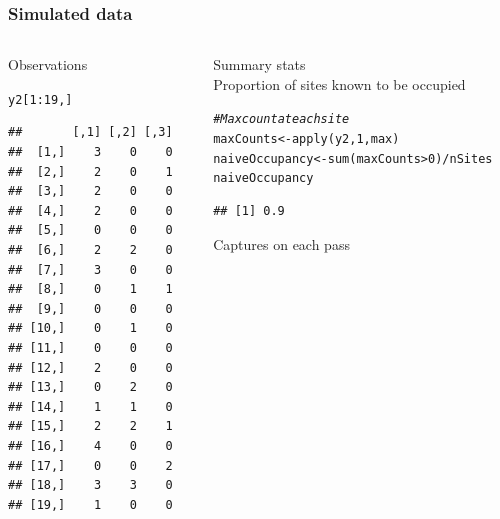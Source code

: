 \documentclass[color=usenames,dvipsnames]{beamer}\usepackage[]{graphicx}\usepackage[]{color}
\makeatletter
\newcommand{\hlnum}[1]{\textcolor[rgb]{0.69,0.494,0}{#1}}%
\newcommand{\hlcom}[1]{\textcolor[rgb]{0.514,0.506,0.514}{\textit{#1}}}%
\newcommand{\hlopt}[1]{\textcolor[rgb]{0,0,0}{#1}}%
\newcommand{\hlstd}[1]{\textcolor[rgb]{0,0,0}{#1}}%
\newcommand{\hlkwb}[1]{\textcolor[rgb]{0,0.341,0.682}{#1}}%
\newcommand{\hlkwd}[1]{\textcolor[rgb]{0.004,0.004,0.506}{#1}}%
\newenvironment{kframe}{%
 \def\at@end@of@kframe{}%
 \ifinner\ifhmode%
  \def\at@end@of@kframe{\end{minipage}}%
  \begin{minipage}{\columnwidth}%
 \fi\fi%
 \def\FrameCommand##1{\hskip\@totalleftmargin \hskip-\fboxsep
 \colorbox{shadecolor}{##1}\hskip-\fboxsep
     \hskip-\linewidth \hskip-\@totalleftmargin \hskip\columnwidth}%
 \MakeFramed {\advance\hsize-\width
   \@totalleftmargin\z@ \linewidth\hsize
   \@setminipage}}%
 {\par\unskip\endMakeFramed%
 \at@end@of@kframe}
\newenvironment{knitrout}{}{} %
\makeatother
\begin{document}
\begin{frame}[fragile]
  \frametitle{Simulated data}
  \begin{columns}
    \begin{column}{0.4\textwidth}
      \small
      Observations
  \vspace{-6pt}
\begin{knitrout}\scriptsize
{}\color{fgcolor}\begin{kframe}
\begin{alltt}
\hlstd{y2[}\hlnum{1}\hlopt{:}\hlnum{19}\hlstd{,]}
\end{alltt}
\begin{verbatim}
##       [,1] [,2] [,3]
##  [1,]    3    0    0
##  [2,]    2    0    1
##  [3,]    2    0    0
##  [4,]    2    0    0
##  [5,]    0    0    0
##  [6,]    2    2    0
##  [7,]    3    0    0
##  [8,]    0    1    1
##  [9,]    0    0    0
## [10,]    0    1    0
## [11,]    0    0    0
## [12,]    2    0    0
## [13,]    0    2    0
## [14,]    1    1    0
## [15,]    2    2    1
## [16,]    4    0    0
## [17,]    0    0    2
## [18,]    3    3    0
## [19,]    1    0    0
\end{verbatim}
\end{kframe}
\end{knitrout}
  \end{column}
  \begin{column}{0.6\textwidth}
    \pause
    {\centering Summary stats \\}
    \vspace{24pt}
    \small
    Proportion of sites known to be occupied
    \vspace{-6pt}
\begin{knitrout}\scriptsize
{}\color{fgcolor}\begin{kframe}
\begin{alltt}
\hlcom{# Max count at each site}
\hlstd{maxCounts} \hlkwb{<-} \hlkwd{apply}\hlstd{(y2,} \hlnum{1}\hlstd{, max)}
\hlstd{naiveOccupancy} \hlkwb{<-} \hlkwd{sum}\hlstd{(maxCounts}\hlopt{>}\hlnum{0}\hlstd{)}\hlopt{/}\hlstd{nSites}
\hlstd{naiveOccupancy}
\end{alltt}
\begin{verbatim}
## [1] 0.9
\end{verbatim}
\end{kframe}
\end{knitrout}
  \pause
  \vfill
  \small
  Captures on each pass
  \vspace{-6pt}

\end{column}
\end{columns}
\end{frame}
\end{document}

